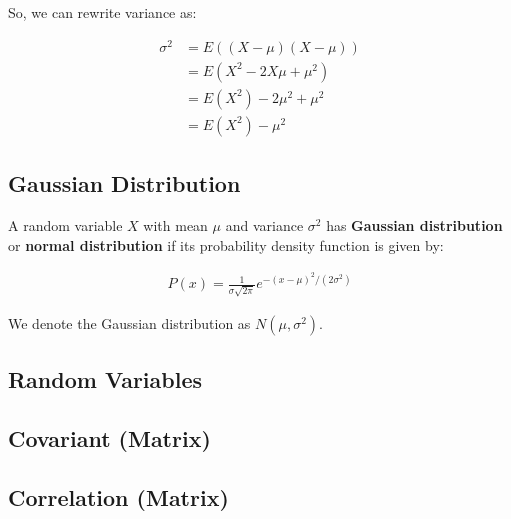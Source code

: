 \documentclass[11pt]{article}
\begin{document}
So, we can rewrite variance as:

\begin{align*}
    \sigma^{2} &= E\left(\left( X - \mu \right)\left( X - \mu \right)\right) \\
    &= E\left( X^{2} - 2X\mu + \mu^{2} \right) \\
    &= E\left( X^{2} \right) - 2\mu^{2} + \mu^{2} \\
    &= E\left( X^{2} \right) - \mu^{2}
\end{align*}

\subsection{Gaussian Distribution}
\label{sec:orgb8c7c16}
A random variable \(X\) with mean \(\mu\) and variance \(\sigma^{2}\) has \textbf{Gaussian distribution} or \textbf{normal distribution} if its probability density function is given by:

\begin{align*}
    P\left( x \right) = \frac{1}{\sigma\sqrt{2\pi}}e^{-\left( x - \mu \right)^{2}/\left(2\sigma^{2}\right)}
\end{align*}

We denote the Gaussian distribution as \(N\left( \mu,\sigma^{2} \right)\).

\subsection{Random Variables}
\label{sec:orge3f06a0}
\subsection{Covariant (Matrix)}
\label{sec:org3f25bf8}
\subsection{Correlation (Matrix)}
\label{sec:org61a3da8}
\end{document}
